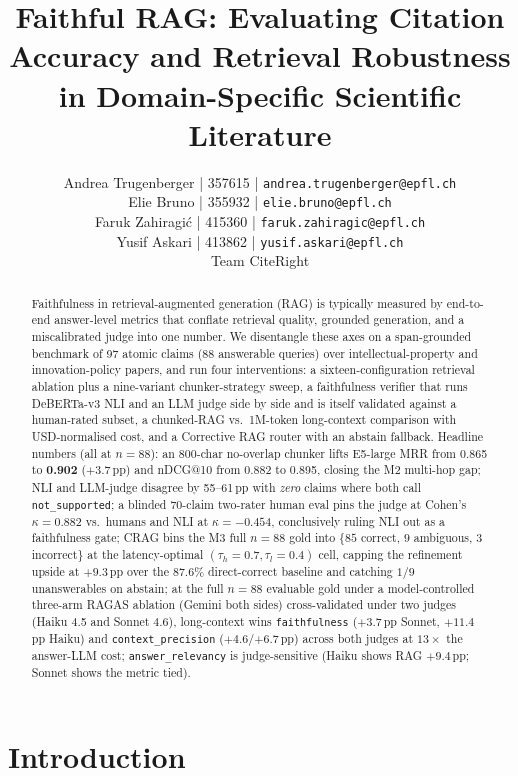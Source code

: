 \documentclass[11pt]{article}
\title{Faithful RAG: Evaluating Citation Accuracy and Retrieval Robustness in Domain-Specific Scientific Literature}
\author{\normalfont
Andrea Trugenberger | 357615 | \texttt{andrea.trugenberger@epfl.ch} \\
Elie Bruno | 355932 | \texttt{elie.bruno@epfl.ch} \\
Faruk Zahiragi\'c | 415360 | \texttt{faruk.zahiragic@epfl.ch} \\
Yusif Askari | 413862 | \texttt{yusif.askari@epfl.ch} \\
Team CiteRight \\
}
\begin{document}
\maketitle
\thispagestyle{fancy}

\begin{abstract}
Faithfulness in retrieval-augmented generation (RAG) is typically measured by end-to-end answer-level metrics that conflate retrieval quality, grounded generation, and a miscalibrated judge into one number. We disentangle these axes on a span-grounded benchmark of 97 atomic claims (88 answerable queries) over intellectual-property and innovation-policy papers, and run four interventions: a sixteen-configuration retrieval ablation plus a nine-variant chunker-strategy sweep, a faithfulness verifier that runs DeBERTa-v3 NLI and an LLM judge side by side and is itself validated against a human-rated subset, a chunked-RAG vs.\ 1M-token long-context comparison with USD-normalised cost, and a Corrective RAG router \citep{yan2024corrective} with an abstain fallback. Headline numbers (all at $n{=}88$): an 800-char no-overlap chunker lifts E5-large MRR from 0.865 to \textbf{0.902} ($+3.7$\,pp) and nDCG@10 from 0.882 to 0.895, closing the M2 multi-hop gap; NLI and LLM-judge disagree by 55--61\,pp with \emph{zero} claims where both call \texttt{not\_supported}; a blinded 70-claim two-rater human eval pins the judge at Cohen's $\kappa{=}0.882$ vs.\ humans and NLI at $\kappa{=}-0.454$, conclusively ruling NLI out as a faithfulness gate; CRAG bins the M3 full $n{=}88$ gold into $\{85$ correct, $9$ ambiguous, $3$ incorrect$\}$ at the latency-optimal $(\tau_h{=}0.7, \tau_l{=}0.4)$ cell, capping the refinement upside at $+9.3$\,pp over the $87.6\%$ direct-correct baseline and catching $1/9$ unanswerables on abstain; at the full $n{=}88$ evaluable gold under a model-controlled three-arm RAGAS ablation (Gemini both sides) cross-validated under two judges (Haiku 4.5 and Sonnet 4.6), long-context wins \texttt{faithfulness} ($+3.7$\,pp Sonnet, $+11.4$\,pp Haiku) and \texttt{context\_precision} ($+4.6$/$+6.7$\,pp) across both judges at $13\times$ the answer-LLM cost; \texttt{answer\_relevancy} is judge-sensitive (Haiku shows RAG $+9.4$\,pp; Sonnet shows the metric tied).
\end{abstract}


\section{Introduction}
\label{sec:intro}
\end{document}
